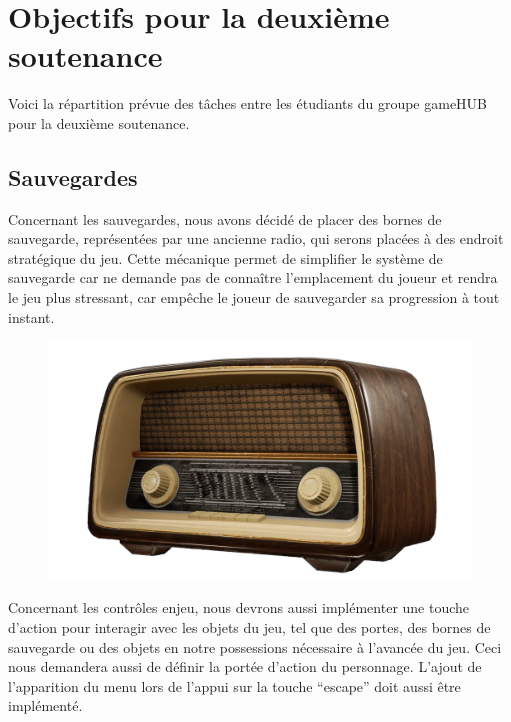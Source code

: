 \section{Objectifs pour la deuxième soutenance}
\noindent Voici la répartition prévue des tâches entre les étudiants du groupe gameHUB pour la deuxième soutenance.

\subsection{Sauvegardes}
\setlength{\parindent}{5ex}
Concernant les sauvegardes, nous avons décidé de placer des bornes de sauvegarde, représentées par une ancienne radio, qui serons placées à des endroit stratégique du jeu. Cette mécanique permet de simplifier le système de sauvegarde car ne demande pas de connaître l’emplacement du joueur et rendra le jeu plus stressant, car empêche le joueur de sauvegarder sa progression à tout instant.
\begin{figure}[H]
\centering
\begin{minipage}{.5\textwidth}
  \centering
  \centerline{\includegraphics[width=1.5\linewidth]{img/assets/save.png}}
  \label{fig:save}
\end{minipage}%
\end{figure}


Concernant les contrôles enjeu, nous devrons aussi implémenter une touche d’action pour interagir avec les objets du jeu, tel que des portes, des bornes de sauvegarde ou des objets en notre possessions nécessaire à l’avancée du jeu. Ceci nous demandera aussi de définir la portée d’action du personnage.
L'ajout de l'apparition du menu lors de l'appui sur la touche ``escape'' doit aussi être implémenté.
\newline

